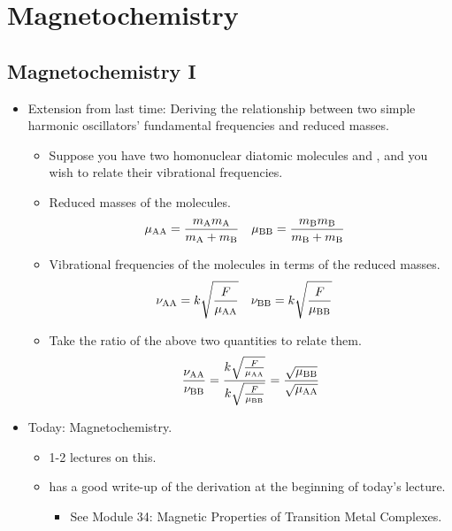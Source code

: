 \documentclass[../notes.tex]{subfiles}
\begin{document}
\chapter{Magnetochemistry}
\section{Magnetochemistry I}
\begin{itemize}
    \item {}Extension from last time: Deriving the relationship between two simple harmonic oscillators' fundamental frequencies and reduced masses.
    \begin{itemize}
        \item Suppose you have two homonuclear diatomic molecules  and , and you wish to relate their vibrational frequencies.
        \item Reduced masses of the molecules.
        \begin{align*}
            \mu_{\ce{AA}} &= \frac{m_{\ce{A}}m_{\ce{A}}}{m_{\ce{A}}+m_{\ce{B}}}&
            \mu_{\ce{BB}} &= \frac{m_{\ce{B}}m_{\ce{B}}}{m_{\ce{B}}+m_{\ce{B}}}
        \end{align*}
        \item Vibrational frequencies of the molecules in terms of the reduced masses.
        \begin{align*}
            \nu_{\ce{AA}} &= k\sqrt{\frac{F}{\mu_{\ce{AA}}}}&
            \nu_{\ce{BB}} &= k\sqrt{\frac{F}{\mu_{\ce{BB}}}}
        \end{align*}
        \item Take the ratio of the above two quantities to relate them.
        \begin{equation*}
            \frac{\nu_{\ce{AA}}}{\nu_{\ce{BB}}} = \frac{k\sqrt{\frac{F}{\mu_{\ce{AA}}}}}{k\sqrt{\frac{F}{\mu_{\ce{BB}}}}}
            = \frac{\sqrt{\mu_{\ce{BB}}}}{\sqrt{\mu_{\ce{AA}}}}
        \end{equation*}
    \end{itemize}
    \item Today: Magnetochemistry.
    \begin{itemize}
        \item 1-2 lectures on this.
        \item \textcite{bib:CHEM20100Notes} has a good write-up of the derivation at the beginning of today's lecture.
        \begin{itemize}
            \item See Module 34: Magnetic Properties of Transition Metal Complexes.

\end{itemize}
\end{itemize}
\end{itemize}
\end{document}
